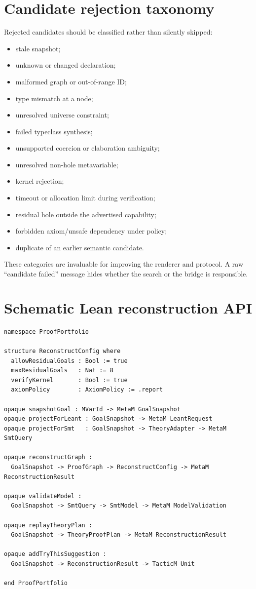 \documentclass[11pt,letterpaper,openany]{report}
\begin{document}
\section{Candidate rejection taxonomy}

Rejected candidates should be classified rather than silently skipped:

\begin{itemize}
  \item stale snapshot;
  \item unknown or changed declaration;
  \item malformed graph or out-of-range ID;
  \item type mismatch at a node;
  \item unresolved universe constraint;
  \item failed typeclass synthesis;
  \item unsupported coercion or elaboration ambiguity;
  \item unresolved non-hole metavariable;
  \item kernel rejection;
  \item timeout or allocation limit during verification;
  \item residual hole outside the advertised capability;
  \item forbidden axiom/unsafe dependency under policy;
  \item duplicate of an earlier semantic candidate.
\end{itemize}

These categories are invaluable for improving the renderer and protocol. A raw
``candidate failed'' message hides whether the search or the bridge is responsible.

\section{Schematic Lean reconstruction API}

\begin{lstlisting}[language=LeanFour,caption={Possible Lean-side API surface}]
namespace ProofPortfolio

structure ReconstructConfig where
  allowResidualGoals : Bool := true
  maxResidualGoals   : Nat := 8
  verifyKernel       : Bool := true
  axiomPolicy        : AxiomPolicy := .report

opaque snapshotGoal : MVarId -> MetaM GoalSnapshot
opaque projectForLeant : GoalSnapshot -> MetaM LeantRequest
opaque projectForSmt   : GoalSnapshot -> TheoryAdapter -> MetaM SmtQuery

opaque reconstructGraph :
  GoalSnapshot -> ProofGraph -> ReconstructConfig -> MetaM ReconstructionResult

opaque validateModel :
  GoalSnapshot -> SmtQuery -> SmtModel -> MetaM ModelValidation

opaque replayTheoryPlan :
  GoalSnapshot -> TheoryProofPlan -> MetaM ReconstructionResult

opaque addTryThisSuggestion :
  GoalSnapshot -> ReconstructionResult -> TacticM Unit

end ProofPortfolio
\end{lstlisting}
\end{document}
